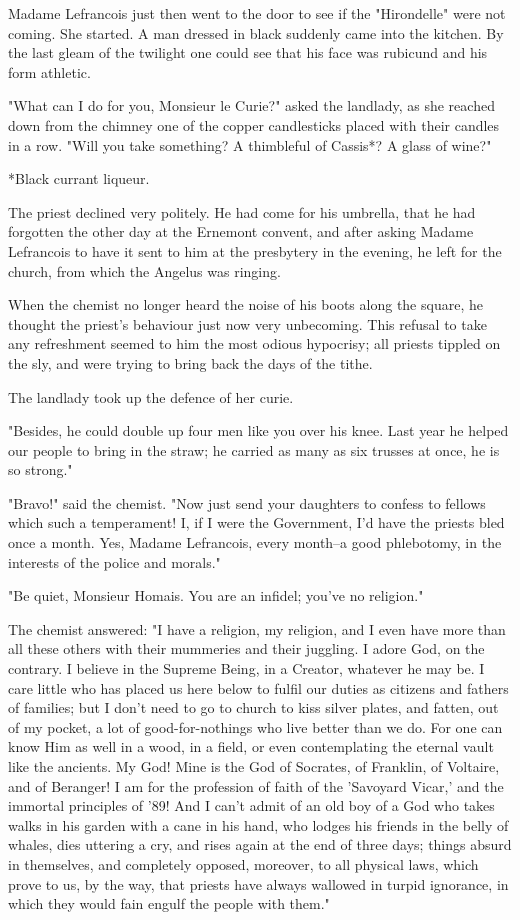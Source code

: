 \documentclass{tufte-book}
\begin{document}
Madame Lefrancois just then went to the door to see if the "Hirondelle"
were not coming. She started. A man dressed in black suddenly came into
the kitchen. By the last gleam of the twilight one could see that his
face was rubicund and his form athletic.

"What can I do for you, Monsieur le Curie?" asked the landlady, as she
reached down from the chimney one of the copper candlesticks placed
with their candles in a row. "Will you take something? A thimbleful of
Cassis*? A glass of wine?"

     *Black currant liqueur.

The priest declined very politely. He had come for his umbrella, that
he had forgotten the other day at the Ernemont convent, and after
asking Madame Lefrancois to have it sent to him at the presbytery in the
evening, he left for the church, from which the Angelus was ringing.

When the chemist no longer heard the noise of his boots along the
square, he thought the priest's behaviour just now very unbecoming. This
refusal to take any refreshment seemed to him the most odious hypocrisy;
all priests tippled on the sly, and were trying to bring back the days
of the tithe.

The landlady took up the defence of her curie.

"Besides, he could double up four men like you over his knee. Last year
he helped our people to bring in the straw; he carried as many as six
trusses at once, he is so strong."

"Bravo!" said the chemist. "Now just send your daughters to confess to
fellows which such a temperament! I, if I were the Government, I'd have
the priests bled once a month. Yes, Madame Lefrancois, every month--a
good phlebotomy, in the interests of the police and morals."

"Be quiet, Monsieur Homais. You are an infidel; you've no religion."

The chemist answered: "I have a religion, my religion, and I even have
more than all these others with their mummeries and their juggling.
I adore God, on the contrary. I believe in the Supreme Being, in a
Creator, whatever he may be. I care little who has placed us here below
to fulfil our duties as citizens and fathers of families; but I don't
need to go to church to kiss silver plates, and fatten, out of my
pocket, a lot of good-for-nothings who live better than we do. For one
can know Him as well in a wood, in a field, or even contemplating the
eternal vault like the ancients. My God! Mine is the God of Socrates, of
Franklin, of Voltaire, and of Beranger! I am for the profession of faith
of the 'Savoyard Vicar,' and the immortal principles of '89! And I can't
admit of an old boy of a God who takes walks in his garden with a
cane in his hand, who lodges his friends in the belly of whales, dies
uttering a cry, and rises again at the end of three days; things absurd
in themselves, and completely opposed, moreover, to all physical laws,
which prove to us, by the way, that priests have always wallowed in
turpid ignorance, in which they would fain engulf the people with them."
\end{document}
